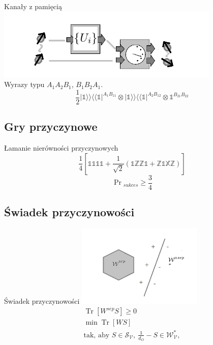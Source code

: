 \documentclass{beamer}
\newcommand{\BBra}[1]{\langle\langle#1|}
\newcommand{\KKet}[1]{|#1\rangle\rangle}
\newcommand{\X}{\mathbb{X}}
\newcommand{\Z}{\mathbb{Z}}
\newcommand{\I}{\mathbb{1}}
\DeclareMathOperator{\Trs}{Tr}
\begin{document}
\begin{frame}{Kanały z pamięcią}
\centering
\includegraphics[width=0.8\textwidth]{obrazki/memory_new}\\
Wyrazy typu $A_1A_2B_1$, $B_1B_2A_1$.
\begin{equation}
\frac{1}{2}\KKet{\I}\BBra{\I}^{A_1B_{11}} \otimes \KKet{\I}\BBra{\I}^{A_2B_{12}} \otimes \I^{B_{21}B_{22}}
\end{equation}
\end{frame}

\subsection{Gry przyczynowe}
\begin{frame}{Łamanie nierówności przyczynowych}
\centering
\begin{equation}
\frac{1}{4}\left[
\I\I\I\I + \frac{1}{\sqrt{2}}(\I\Z\Z\I + \Z\I\X\Z)
\right]
\end{equation}
\begin{equation}
\Pr{}_{sukces} \geq \frac{3}{4}
\end{equation}
\end{frame}
\subsection{Świadek przyczynowości}
\begin{frame}{Świadek przyczynowości}
\centering
\includegraphics[width=0.45\textwidth]{obrazki/hip}
\begin{gather}
\Trs\left[ W^{sep}S\right] \geq 0 \\
\min \Trs \left[ WS \right]\\
\text{tak, aby } S \in \mathcal{S_V},~ \frac{\I}{d_O} - S \in \mathcal{W^*_V},
\end{gather}
\end{frame}
\end{document}
